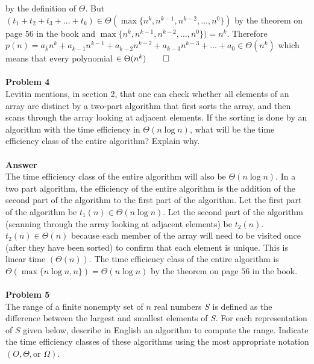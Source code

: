 \documentclass[11pt]{article}
\begin{document}
by the definition of $\Theta$.
But $(t_1 + t_2 + t_3 + ... + t_k) \in \Theta(\max\{ n^k, n^{k-1}, n^{k-2},
..., n^0\})$ by the theorem on page $56$ in the book and 
$\max\{n^k, n^{k-1}, n^{k-2}, ..., n^0\}) = n^k.$ Therefore
$p(n) = a_kn^k + a_{k-1}n^{k-1} + a_{k-2}n^{k-2} + a_{k-3}n^{k-3} + ... +
a_0 \in \Theta(n^k)$ which means that every polynomial $\in \Theta(n^k) \qed$ 
\\
\\
\noindent\textbf{Problem 4} \\
Levitin mentions, in section 2, that one can check whether all elements of 
an array are distinct by a two-part algorithm that first sorts the array, and
then scans through the array looking at adjacent elements. If the sorting is
done by an algorithm with the time efficiency in $\Theta(n \log n)$, what will
be the time efficiency class of the entire algorithm? Explain why.\\ 
\\
\noindent\textbf{Answer}\\
The time efficiency class of the entire algorithm will also be $\Theta(n \log
n)$. In a two part algorithm, the efficiency of the entire algorithm is the 
addition of the second part of the algorithm to the first part of the 
algorithm. Let the first part of the algorithm be $t_1(n) \in \Theta(n \log
n)$. Let the second part of the algorithm (scanning through the array looking
at adjacent elements) be $t_2(n)$. $t_2(n) \in \Theta(n)$
because each member of the array will need to be visited once (after they
have been sorted) to confirm that each element is unique. This is linear
time $(\Theta(n))$. The time efficiency class of the entire algorithm is
$\Theta(\max \{n \log n, n\}) = \Theta(n \log n)$ by the theorem on page $56$
in the book. \\
\\ 
\noindent\textbf{Problem 5}\\
The range of a finite nonempty set of $n$ real numbers $S$ is defined as the
difference between the largest and smallest elements of $S$. For each
representation of $S$ given below, describe in English an algorithm to compute
the range. Indicate the time efficiency classes of these algorithms using the
most appropriate notation $(O, \Theta, \text{or } \Omega)$. 
\end{document}
